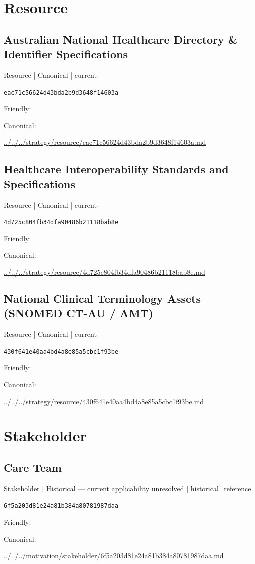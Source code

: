 \documentclass[10pt,a4paper]{article}
\begin{document}
\section*{Resource}
\subsection*{Australian National Healthcare Directory \& Identifier Specifications}
{\small Resource | Canonical | current}\par
\texttt{eac71c56624d43bda2b9d3648f14603a}\par
Friendly: \par
Canonical: \par
{\footnotesize\url{../../../strategy/resource/eac71c56624d43bda2b9d3648f14603a.md}}\par
\subsection*{Healthcare Interoperability Standards and Specifications}
{\small Resource | Canonical | current}\par
\texttt{4d725c804fb34dfa90486b21118bab8e}\par
Friendly: \par
Canonical: \par
{\footnotesize\url{../../../strategy/resource/4d725c804fb34dfa90486b21118bab8e.md}}\par
\subsection*{National Clinical Terminology Assets (SNOMED CT-AU / AMT)}
{\small Resource | Canonical | current}\par
\texttt{430f641e40aa4bd4a8e85a5cbc1f93be}\par
Friendly: \par
Canonical: \par
{\footnotesize\url{../../../strategy/resource/430f641e40aa4bd4a8e85a5cbc1f93be.md}}\par
\section*{Stakeholder}
\subsection*{Care Team}
{\small Stakeholder | Historical — current applicability unresolved | historical\_reference}\par
\texttt{6f5a203d81e24a81b384a80781987daa}\par
Friendly: \par
Canonical: \par
{\footnotesize\url{../../../motivation/stakeholder/6f5a203d81e24a81b384a80781987daa.md}}\par
\end{document}
